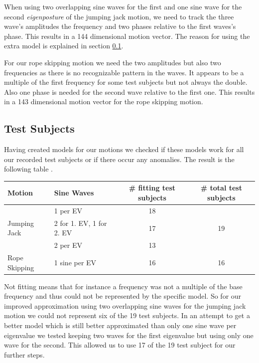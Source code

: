 \documentclass[a4paper]{article}
\begin{document}
When using two overlapping sine waves for the first and one sine wave for the second \emph{eigenposture} of the jumping jack motion, we need to track the three wave's amplitudes the frequency and two phases relative to the first waves's phase.
This results in a 144 dimensional motion vector.
The reason for using the extra model is explained in section \ref{sec:testsubjects}.

For our rope skipping motion we need the two amplitudes but also two frequencies as there is no recognizable pattern in the waves.
It appears to be a multiple of the first frequency for some test subjects but not always the double.
Also one phase is needed for the second wave relative to the first one.
This results in a 143 dimensional motion vector for the rope skipping motion.

\subsection{Test Subjects}
\label{sec:testsubjects}
Having created models for our motions we checked if these models work for all our recorded test subjects or if there occur any anomalies.
The result is the following table .

\begin{center}
\begin{tabular}{l|l|c|c}
Motion & Sine Waves & \# fitting test subjects & \# total test subjects \\
\hline
\multirow{3}{*}{Jumping Jack} & 1 per EV & 18 & \multirow{3}{*}{19} \\ \cline{2-3}
 & 2 for 1. EV, 1 for 2. EV  & 17 \\ \cline{2-3}
 & 2 per EV & 13 \\ \cline{2-3}
\hline
Rope Skipping & 1 sine per EV & 16 & 16 \\
\end{tabular}
\end{center}

Not fitting means that for instance a frequency was not a multiple of the base frequency and thus could not be represented by the specific model.
So for our improved approximation using two overlapping sine waves for the jumping jack motion we could not represent six of the 19 test subjects.
In an attempt to get a better model which is still better approximated than only one sine wave per eigenvalue we tested keeping two waves for the first eigenvalue but using only one wave for the second.
This allowed us to use 17 of the 19 test subject for our further steps.
\end{document}
